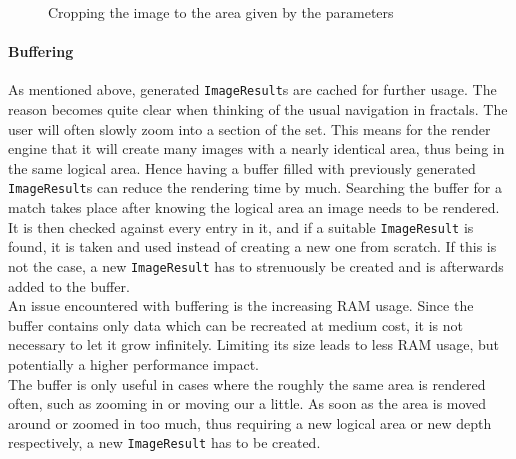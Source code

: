 \documentclass[10pt,a4paper,titlepage]{article}
\begin{document}
	\begin{figure}
		\centering
		\caption{Cropping the image to the area given by the parameters}
		\label{fig:cropping the area}
	\end{figure}
	
	\paragraph{Buffering} \label{par:paragraph_image_creation_buffering}
	As mentioned above, generated \verb|ImageResult|s are cached for further usage. The reason becomes quite clear when thinking of the usual navigation in fractals. The user will often slowly zoom into a section of the set. This means for the render engine that it will create many images with a nearly identical area, thus being in the same logical area. Hence having a buffer filled with previously generated \verb|ImageResult|s can reduce the rendering time by much. Searching the buffer for a match takes place after knowing the logical area an image needs to be rendered. It is then checked against every entry in it, and if a suitable \verb|ImageResult| is found, it is taken and used instead of creating a new one from scratch. If this is not the case, a new \verb|ImageResult| has to strenuously be created and is afterwards added to the buffer.\\
	An issue encountered with buffering is the increasing RAM usage. Since the buffer contains only data which can be recreated at medium cost, it is not necessary to let it grow infinitely. Limiting its size leads to less RAM usage, but potentially a higher performance impact.\\ The buffer is only useful in cases where the roughly the same area is rendered often, such as zooming in or moving our a little. As soon as the area is moved around or zoomed in too much, thus requiring a new logical area or new depth respectively, a new \verb|ImageResult| has to be created.

	\fi
\end{document}
